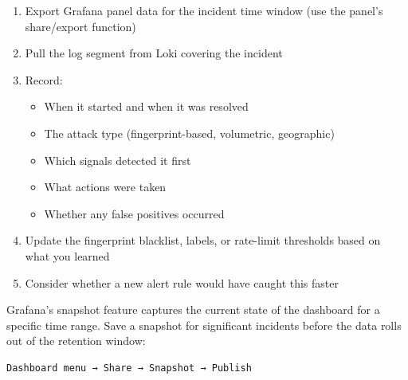 \begin{enumerate}
  \item Export Grafana panel data for the incident time window (use the panel's
    share/export function)
  \item Pull the log segment from Loki covering the incident
  \item Record:
    \begin{itemize}
      \item When it started and when it was resolved
      \item The attack type (fingerprint-based, volumetric, geographic)
      \item Which signals detected it first
      \item What actions were taken
      \item Whether any false positives occurred
    \end{itemize}
  \item Update the fingerprint blacklist, labels, or rate-limit thresholds based
    on what you learned
  \item Consider whether a new alert rule would have caught this faster
\end{enumerate}

\begin{tipbox}
Grafana's snapshot feature captures the current state of the dashboard for a
specific time range. Save a snapshot for significant incidents before the data
rolls out of the retention window:
\begin{lstlisting}[language=bash, numbers=none]
Dashboard menu → Share → Snapshot → Publish
\end{lstlisting}
\end{tipbox}
